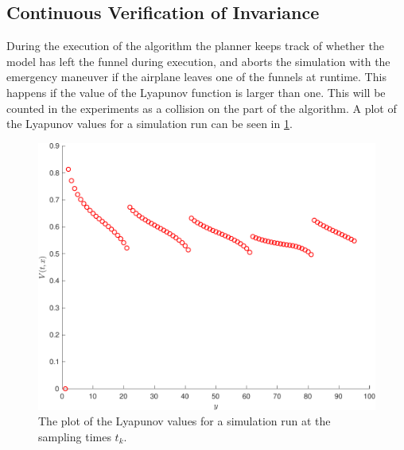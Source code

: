 
\subsection{Continuous Verification of Invariance}
\label{subsec:check-vehicle-in-funnel}


During the execution of the \rrtfunnel{} algorithm the planner keeps track of
whether the model has left the funnel during execution, and aborts the
simulation with the emergency maneuver if the airplane leaves one of the funnels
at runtime. This happens if the value of the Lyapunov function is larger than
one. This will be counted in the experiments as a collision on the part of the
\rrtfunnel{} algorithm. A plot of the Lyapunov values for a simulation run can
be seen in \cref{fig:lyapunov-values}.

\begin{figure}
  \centering
  \includegraphics[width=.8\textwidth]{figures/experiments/lyapunov-values-simulation-run}
  \caption[A plot of the Lyapunov values for an experiment]{The plot of the Lyapunov values for a simulation run at the sampling
    times \(t_k\).}
  \label{fig:lyapunov-values}
\end{figure}

